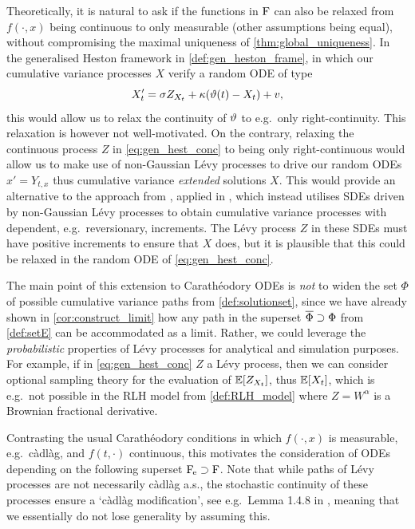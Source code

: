 Theoretically, it is natural to ask if the functions in $\mathrm{F}$ can also be relaxed from $f(\cdot,x)$ being continuous to only measurable (other assumptions being equal), without compromising the maximal uniqueness of \autoref{thm:global_uniqueness}. In the generalised Heston framework in \autoref{def:gen_heston_frame}, in which our cumulative variance processes $X$ verify a random ODE of type~
\begin{equation}\label{eq:gen_hest_conc}
    X'_t = \sigma Z_{X_t} + \kappa(\vartheta(t) - X_t) + v,
\end{equation}
this would allow us to relax the continuity of $\vartheta$ to e.g.~only right-continuity. This relaxation is however not well-motivated. On the contrary, relaxing the continuous process $Z$ in \autoref{eq:gen_hest_conc} to being only right-continuous would allow us to make use of non-Gaussian L\'evy processes to drive our random ODEs $x'=Y_{t,x}$ thus cumulative variance \emph{extended} solutions $X$. This would provide an alternative to the approach from \cite{barndorff-nielsen_2001b}, applied in \cite{carr_2003}, which instead utilises SDEs driven by non-Gaussian L\'evy processes to obtain cumulative variance processes with dependent, e.g.~reversionary, increments. The L\'evy process $Z$ in these SDEs must have positive increments to ensure that $X$ does, but it is plausible that this could be relaxed in the random ODE of \autoref{eq:gen_hest_conc}.

\vspace{2mm}The main point of this extension to Carath\'eodory ODEs is \emph{not} to widen the set $\Phi$ of possible cumulative variance paths from \autoref{def:solutionset}, since we have already shown in \autoref{cor:construct_limit} how any path in the superset $\overline{\Phi}\supset\Phi$ from \autoref{def:setE} can be accommodated as a limit. Rather, we could leverage the \emph{probabilistic} properties of L\'evy processes for analytical and simulation purposes. For example, if in \autoref{eq:gen_hest_conc} $Z$ a L\'evy process, then we can consider optional sampling theory for the evaluation of $\mathbb{E}[Z_{X_t}]$, thus $\mathbb{E}[X_t]$, which is e.g.~not possible in the RLH model from \autoref{def:RLH_model} where $Z=W^\alpha$ is a Brownian fractional derivative.

Contrasting the usual Carath\'eodory conditions in which $f(\cdot,x)$ is measurable, e.g.~c\`adl\`ag, and $f(t,\cdot)$ continuous, this motivates the consideration of ODEs depending on the following superset $\mathrm{F_{\:\!\! e}}\supset\mathrm{F}$. Note that while paths of L\'evy processes are not necessarily c\`adl\`ag a.s., the stochastic continuity of these processes ensure a `c\`adl\`ag modification', see e.g.~Lemma 1.4.8 in \cite{applebaum_2009}, meaning that we essentially do not lose generality by assuming this.

